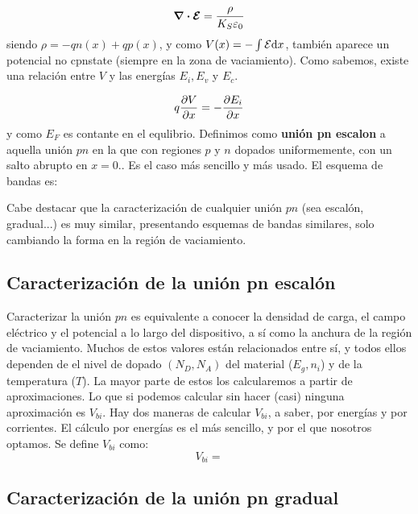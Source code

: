 \begin{equation}
    \div \boldsymbol{\mathcal{E}} = \frac{\rho}{K_S \varepsilon_0}
\end{equation}
siendo $\rho=-qn(x)+qp(x)$, y como $V(x)=-\int \mathcal{E} \mathrm{d} x$, también aparece un potencial no cpnstate (siempre en la zona de vaciamiento). Como sabemos, existe una relación entre $V$ y las energías $E_i,E_v$ y $E_c$. 

\begin{equation*}
    q \frac{\partial V}{\partial x} = - \frac{\partial E_i}{\partial x}
\end{equation*}
y como $E_F$ es contante en el equlibrio. Definimos como \textbf{unión pn escalon} a aquella unión $pn$ en la que con regiones $p$ y $n$ dopados uniformemente, con un salto abrupto en $x=0$.. Es el caso más sencillo y más usado. El esquema de bandas es:


Cabe destacar que la caracterización de cualquier unión $pn$ (sea escalón, gradual...) es muy similar, presentando esquemas de bandas similares, solo cambiando la forma en la región de vaciamiento.


\subsection{Caracterización de la unión pn escalón}
Caracterizar la unión $pn$ es equivalente a conocer la densidad de carga, el campo eléctrico y el potencial a lo largo del dispositivo, a sí como la anchura de la región de vaciamiento. Muchos de estos valores están relacionados entre sí, y todos ellos dependen de el nivel de dopado $(N_D,N_A)$ del material ($E_g,n_i$) y de la temperatura ($T$). La mayor parte de estos los calcularemos a partir de aproximaciones. Lo que si podemos calcular sin hacer (casi) ninguna aproximación es $V_{bi}$. Hay dos maneras de calcular $V_{bi}$, a saber, por energías y por corrientes. El cálculo por energías es el más sencillo, y por el que nosotros optamos. Se define $V_{bi}$ como:
\begin{equation}
    V_{bi}= 
\end{equation}

\subsection{Caracterización de la unión pn gradual}


